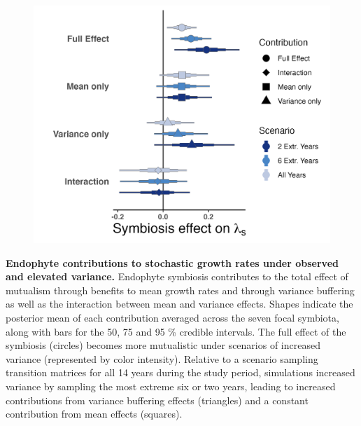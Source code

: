 \documentclass[12pt]{article}
\begin{document}
\begin{figure}
	\centering
	\includegraphics[width=.8\linewidth]{StochDemo_fig3.png}
\end{figure}
 \textbf{Endophyte contributions to stochastic growth rates under observed and elevated variance.} Endophyte symbiosis contributes to the total effect of mutualism through benefits to mean growth rates and through variance buffering as well as the interaction between mean and variance effects. Shapes indicate the posterior mean of each contribution averaged across the seven focal symbiota, along with bars for the 50, 75 and 95 \% credible intervals.  The full effect of the symbiosis (circles) becomes more mutualistic under scenarios of increased variance (represented by color intensity). Relative to a scenario sampling transition matrices for all 14 years during the study period, simulations increased variance by sampling the most extreme six or two years, leading to increased contributions from variance buffering effects (triangles) and a constant contribution from mean effects (squares).
\newpage
\end{document}
